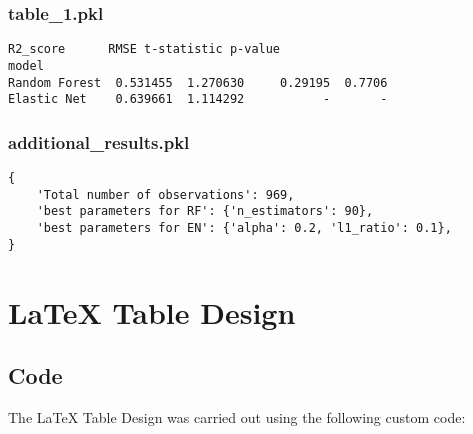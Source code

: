 \documentclass[11pt]{article}
\begin{document}
\subsubsection*{table\_1.pkl}

\begin{Verbatim}[tabsize=4]
               R2_score      RMSE t-statistic p-value
model
Random Forest  0.531455  1.270630     0.29195  0.7706
Elastic Net    0.639661  1.114292           -       -
\end{Verbatim}

\subsubsection*{additional\_results.pkl}

\begin{Verbatim}[tabsize=4]
{
    'Total number of observations': 969,
    'best parameters for RF': {'n_estimators': 90},
    'best parameters for EN': {'alpha': 0.2, 'l1_ratio': 0.1},
}
\end{Verbatim}

\section{LaTeX Table Design}
\subsection{{Code}}
The LaTeX Table Design was carried out using the following custom code:
\end{document}
